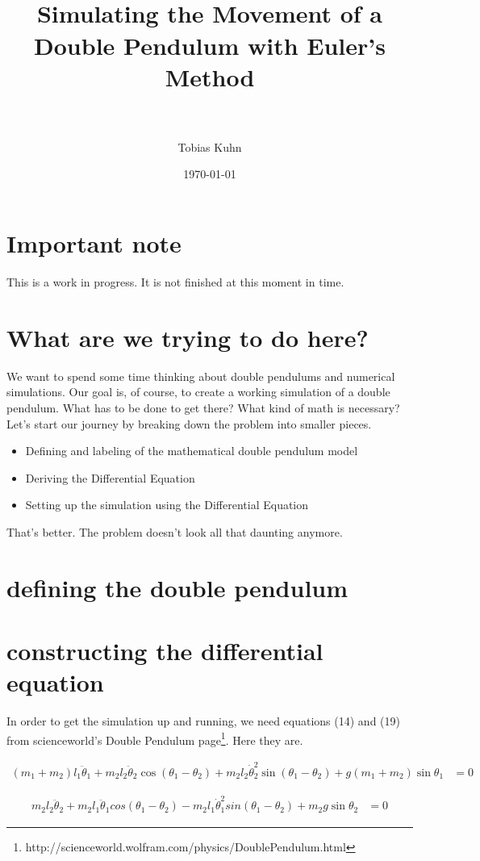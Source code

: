 \documentclass[paper=a4, fontsize=11pt]{scrartcl} %
\title{
\normalfont \normalsize 
\horrule{0.5pt} \\[0.4cm] %
\huge Simulating the Movement of a Double Pendulum with Euler's Method \\ %
\horrule{2pt} \\[0.5cm] %
}
\author{Tobias Kuhn} %
\date{\normalsize\today} %
\numberwithin{equation}{section} %
\numberwithin{figure}{section} %
\numberwithin{table}{section} %
\begin{document}
\maketitle %

\section{Important note}
This is a work in progress. It is not finished at this moment in time.

\section{What are we trying to do here?}
We want to spend some time thinking about double pendulums and numerical simulations.
Our goal is, of course, to create a working simulation of a double pendulum. 
What has to be done to get there? What kind of math is necessary?
Let's start our journey by breaking down the problem into smaller pieces.
\begin{itemize}
  \item Defining and labeling of the mathematical double pendulum model 
  \item Deriving the Differential Equation
  \item Setting up the simulation using the Differential Equation
\end{itemize}
That's better. The problem doesn't look all that daunting anymore.

\section{defining the double pendulum}

\section{constructing the differential equation}
In order to get the simulation up and running, we need equations (14) and (19) from scienceworld's Double Pendulum page\footnote{http://scienceworld.wolfram.com/physics/DoublePendulum.html}.
Here they are.

\begin{align} \label{eq:1}
  (m_1 + m_2) l_1 \ddot{\theta}_1 + m_2 l_2 \ddot{\theta}_2 \cos(\theta_1 - \theta_2)
  + m_2 l_2 \dot{\theta}^2_2 \sin(\theta_1 - \theta_2) + g (m_1 + m_2) \sin \theta_1 &= 0
\end{align}

\begin{align} \label{eq:2}
  m_2 l_2 \ddot{\theta}_2 + m_2 l_1 \ddot{\theta}_1 cos(\theta_1 - \theta_2)
  - m_2 l_1 \dot{\theta}^2_1 sin(\theta_1 - \theta_2) + m_2 g \sin \theta_2 &= 0
\end{align}
\end{document}

